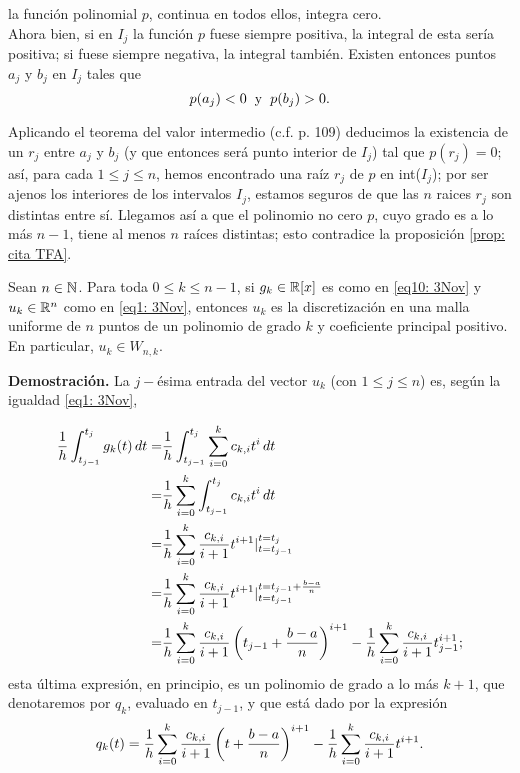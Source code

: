 \noindent la función polinomial $p$, continua en todos ellos, 
integra cero. \\

Ahora bien, si en $I_{j}$ la función $p$ fuese siempre
positiva, la integral de esta sería positiva; si fuese
siempre negativa, la integral también. Existen entonces
puntos $a_{j}$ y $ b_{j}$ en $I_{j}$ tales que
\[
p(a_{j})<0 \hspace{0.2cm} \text{y}
\hspace{0.2cm} p(b_{j})>0.
\]

\noindent Aplicando el teorema del valor intermedio
(c.f. \cite{spivak} p. 109)  
deducimos la existencia de un 
$r_{j}$ entre $a_{j}$ y 
$b_{j}$ (y que entonces será punto
interior de $I_{j}$) tal que $p(r_{j})=0$;
así, para cada $1 \leq j \leq n$,
hemos
encontrado una raíz $r_{j}$ de $p$ en int($I_{j}$);
por ser ajenos los interiores de los intervalos $I_{j}$,
estamos seguros de que las $n$ raices $r_{j}$ son distintas
entre sí.
Llegamos así
a que el polinomio no cero $p$, cuyo grado es a lo más $n-1$,
tiene al menos $n$ raíces distintas; esto
contradice la proposición \ref{prop: cita TFA}.
\QEDB
\vspace{0.2cm}

\begin{prop}
\label{prop: uk son discretizaciones pol...}
Sean $n \in \mathbb{N}$. Para toda $0 \leq k\leq n-1$, si
$g_{k} \in \mathbb{R}[x]$ es como en \eqref{eq10: 3Nov}
y $u_{k} \in \mathbb{R}^{n}$ como en
\eqref{eq1: 3Nov}, entonces
$u_{k}$ es la discretización en una malla uniforme
de $n$ puntos de un polinomio de grado $k$
y coeficiente principal positivo. En particular,
$u_{k} \in W_{n,k}$.
\end{prop}
\noindent
\textbf{Demostración.}
La $j-$ésima entrada del vector $u_{k}$
(con $1 \leq j \leq n$)
es, según la igualdad \eqref{eq1: 3Nov},

\begin{align} 
\frac{1}{h} \int_{t_{j-1}}^{t_{j}}{g_{k}(t)} \,dt = &
\frac{1}{h} \int_{t_{j-1}}^{t_{j}}{\suma{i=0}{k}{c_{k,i}t^{i}}} \,dt 
\nonumber \\
= & \frac{1}{h} \suma{i=0}{k}{\int_{t_{j-1}}^{t_{j}}{c_{k,i}t^{i}} \, dt}
\nonumber \\
= & \frac{1}{h} \suma{i=0}{k}{
\frac{c_{k,i}}{i+1}t^{i+1} | ^{t=t_{j}}_{t=t_{j-1}}
} 
\nonumber \\
= & \frac{1}{h} \suma{i=0}{k}{
\frac{c_{k,i}}{i+1}t^{i+1} | ^{t=t_{j-1}+\frac{b-a}{n}}_{t=t_{j-1}}} 
\nonumber \\
= & 
\frac{1}{h} \suma{i=0}{k}{
\frac{c_{k,i}}{i+1} \left( t_{j-1}+ \frac{b-a}{n} \right)^{i+1}}-
\frac{1}{h} \suma{i=0}{k}{
\frac{c_{k,i}}{i+1} t_{j-1}^{i+1}}; \nonumber\\
\end{align}
esta última expresión, en principio, es un polinomio
de grado a lo más $k+1$,
que denotaremos por $q_{k}$, evaluado en $t_{j-1}$,
y que está dado por la expresión
\begin{equation} \label{eq2: 5Nov}
q_{k}(t)= \frac{1}{h} \sum\limits_{i=0}^{k}
\frac{c_{k,i}}{i+1} \left(t+ \frac{b-a}{n} \right)^{i+1}-
\frac{1}{h} \sum\limits_{i=0}^{k}
\frac{c_{k,i}}{i+1} t^{i+1}.
\end{equation}

